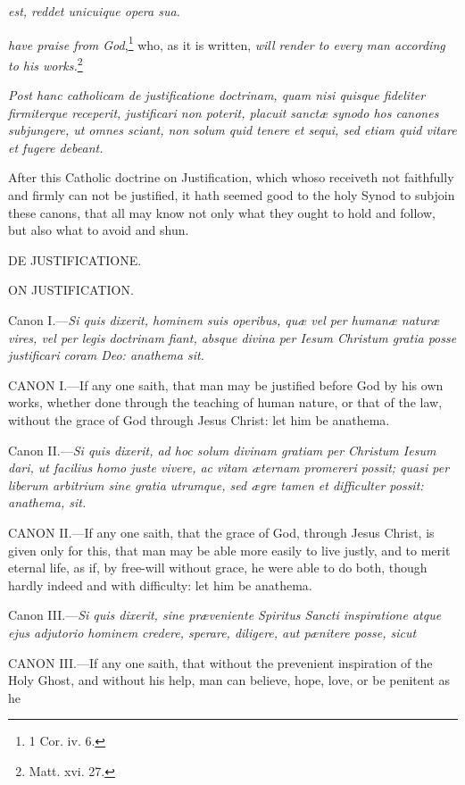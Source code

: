 \emph{est, reddet unicuique opera sua.}

\emph{have praise from God},\footnote{\par   1 Cor. iv. 6.} who, as it is written, \emph{will render to every man according to his works.}\footnote{\par   Matt. xvi. 27.}

\emph{Post hanc catholicam de justificatione doctrinam, quam nisi quisque fideliter firmiterque receperit, justificari non poterit, placuit sanctæ synodo hos canones subjungere, ut omnes sciant, non solum quid tenere et sequi, sed etiam quid vitare et fugere debeant.}

After this Catholic doctrine on Justification, which whoso receiveth not faithfully and firmly can not be justified, it hath seemed good to the holy Synod to subjoin these canons, that all may know not only what they ought to hold and follow, but also what to avoid and shun.

DE JUSTIFICATIONE.

ON JUSTIFICATION.

Canon I.—\emph{Si quis dixerit, hominem suis operibus, quæ vel per humanæ naturæ vires, vel per legis doctrinam fiant, absque divina per Iesum Christum gratia posse justificari coram Deo: anathema sit.}

CANON I.—If any one saith, that man may be justified before God by his own works, whether done through the teaching of human nature, or that of the law, without the grace of God through Jesus Christ: let him be anathema.

Canon II.—\emph{Si quis dixerit, ad hoc solum divinam gratiam per Christum Iesum dari, ut facilius homo juste vivere, ac vitam æternam promereri possit; quasi per liberum arbitrium sine gratia utrumque, sed ægre tamen et difficulter possit: anathema, sit.}

CANON II.—If any one saith, that the grace of God, through Jesus Christ, is given only for this, that man may be able more easily to live justly, and to merit eternal life, as if, by free-will without grace, he were able to do both, though hardly indeed and with difficulty: let him be anathema.

Canon III.—\emph{Si quis dixerit, sine præveniente Spiritus Sancti inspiratione atque ejus adjutorio hominem credere, sperare, diligere, aut pænitere posse, sicut}

CANON III.—If any one saith, that without the prevenient inspiration of the Holy Ghost, and without his help, man can believe, hope, love, or be penitent as he

